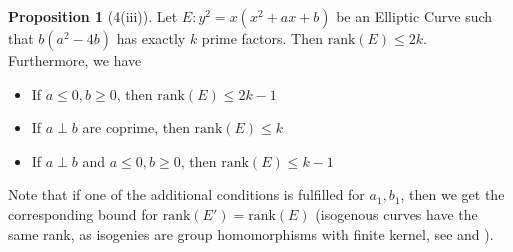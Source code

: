 \documentclass{scrartcl}
\theoremstyle{definition}
\newtheorem{prop}[subsection]{Proposition}
\begin{document}
\begin{prop}[4(iii)]
    \label{prop:rank_bound}
    Let $E: y^2 = x(x^2 + a x + b)$ be an Elliptic Curve such that $b(a^2 - 4b)$ has exactly $k$ prime factors.
    Then $\mathrm{rank}(E) \leq 2k$.
    Furthermore, we have
    \begin{itemize}
        \item If $a \leq 0, b \geq 0$, then $\mathrm{rank}(E) \leq 2k - 1$
        \item If $a \perp b$ are coprime, then $\mathrm{rank}(E) \leq k$
        \item If $a \perp b$ and $a \leq 0, b \geq 0$, then $\mathrm{rank}(E) \leq k - 1$
    \end{itemize}
    Note that if one of the additional conditions is fulfilled for $a_1, b_1$, then we get the corresponding bound for $\mathrm{rank}(E') = \mathrm{rank}(E)$ 
    (isogenous curves have the same rank, as isogenies are group homomorphisms with finite kernel, see \cite[Thm III.4.8]{silverman} and \cite[Corollary III.4.9]{silverman}).
\end{prop}
\end{document}
